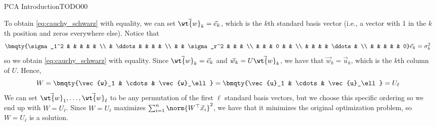 \begin{problem}{PCA Introduction}{TODO}{0}{0}
\begin{problempartlist}
        \begin{solution}{0in}
            To obtain \cref{eq:cauchy_schwarz} with equality, we can set $\vec{\wt{w}}_k = \vec{e}_k$, which is the $k$th standard basis vector (i.e., a vector with 1 in the $k$th position and zeros everywhere else). Notice that
            \begin{equation}
                \bmqty{\sigma_1^2 & & & & & \\ & \ddots & & & & \\ & & \sigma_r^2 & & & \\ & & & 0 & & \\ & & & & \ddots & \\ & & & & & 0} \vec{e}_k = \sigma^2_k
            \end{equation}
            so we obtain \cref{eq:cauchy_schwarz} with equality. Since $\vec{\wt{w}}_k = \vec{e}_k$ and $\vec{w}_k = U \vec{\wt{w}}_k$, we have that $\vec{w}_k = \vec{u}_k$, which is the $k$th column of $U$. Hence,
            \begin{equation}
                W = \bmqty{\vec{w}_1 & \cdots & \vec{w}_\ell} = \bmqty{\vec{u}_1 & \cdots & \vec{u}_\ell} = U_\ell
            \end{equation}
            We can set $\vec{\wt{w}}_1, \ldots, \vec{\wt{w}}_\ell$ to be any permutation of the first $\ell$ standard basis vectors, but we choose this specific ordering so we end up with $W = U_\ell$. Since $W = U_\ell$ maximizes $\sum_{i = 1}^n \norm{W^\top \vec{x}_i}^2$, we have that it minimizes the original optimization problem, so $W = U_\ell$ is a solution.
        \end{solution}
    \end{problempartlist}
\end{problem}